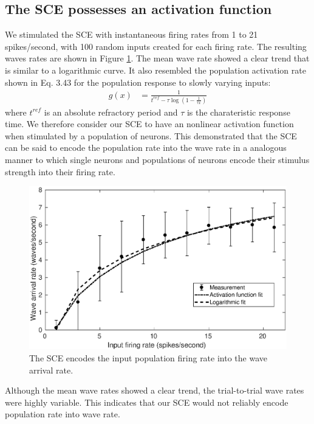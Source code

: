 \documentclass[12pt]{article}
\begin{document}
\FloatBarrier

\subsection*{The SCE possesses an activation function}
We stimulated the SCE with instantaneous firing rates from 1 to 21 spikes/second, with 100 random inputs created for each firing rate.
The resulting waves rates are shown in Figure \ref{fig:sce_activation_function}.
The mean wave rate showed a clear trend that is similar to a logarithmic curve. 
It also resembled the population activation rate shown in \cite{Trappenberg2010} Eq. 3.43 for the population response to slowly varying inputs:
\begin{align}
 g(x) &= \frac{1}{t^{ref}-\tau \log{(1-\frac{1}{\tau x})}}
\end{align}
where $t^{ref}$ is an absolute refractory period and $\tau$ is the charateristic response time.
We therefore consider our SCE to have an nonlinear activation function when stimulated by a  population of neurons.
This demonstrated that the SCE can be said to encode the population rate into the wave rate in a analogous manner to which single neurons and populations of neurons encode their stimulus strength into their firing rate.

\begin{figure}[!htb]
 \centering
 \includegraphics[width=\textwidth]{fig/SCE_2x2_FRE}
 \caption{The SCE encodes the input population firing rate into the wave arrival rate. }
 \label{fig:sce_activation_function}
\end{figure}

Although the mean wave rates showed a clear trend, the trial-to-trial wave rates were highly variable. 
This indicates that our SCE would not reliably encode population rate into wave rate.
\end{document}
